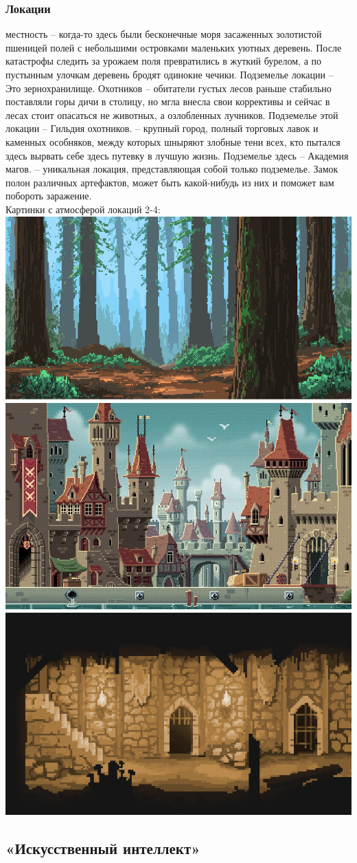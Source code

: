\documentclass{article}
\begin{document}
\subsubsection{Локации}
\begin{itemize}
 местность – когда-то здесь были бесконечные моря засаженных золотистой пшеницей полей с небольшими островками маленьких уютных деревень. После катастрофы следить за урожаем поля превратились в жуткий бурелом, а по пустынным улочкам деревень бродят одинокие чечики. Подземелье локации – Это зернохранилище.
 Охотников – обитатели густых лесов раньше стабильно поставляли горы дичи в столицу, но мгла внесла свои коррективы и сейчас в лесах стоит опасаться не животных, а озлобленных лучников. Подземелье этой локации – Гильдия охотников.
 – крупный город, полный торговых лавок и каменных особняков, между которых шныряют злобные тени всех, кто пытался здесь вырвать себе здесь путевку в лучшую жизнь. Подземелье здесь – Академия магов.
 – уникальная локация, представляющая собой только подземелье. Замок полон различных артефактов, может быть какой-нибудь из них и поможет вам побороть заражение.\\
Картинки с атмосферой  локаций 2-4:\\
\includegraphics[width=0.3\linewidth]{images/dd_les.png}\hspace{0.5cm}\includegraphics[width=0.3\linewidth]{images/dd_stolica.jpg}\hspace{0.5cm}\includegraphics[width=0.3\linewidth]{images/dd_zamok.png}
\end{itemize}
\subsection{«Искусственный интеллект»}
\end{document}
